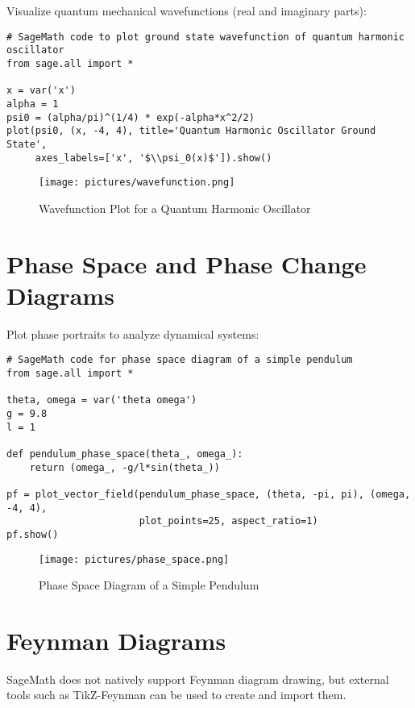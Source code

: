 \documentclass[12pt]{book}
\begin{document}
Visualize quantum mechanical wavefunctions (real and imaginary parts):

\begin{verbatim}
# SageMath code to plot ground state wavefunction of quantum harmonic oscillator
from sage.all import *

x = var('x')
alpha = 1
psi0 = (alpha/pi)^(1/4) * exp(-alpha*x^2/2)
plot(psi0, (x, -4, 4), title='Quantum Harmonic Oscillator Ground State',
     axes_labels=['x', '$\\psi_0(x)$']).show()
\end{verbatim}

\begin{figure}[H]
  \centering
  \texttt{[image: pictures/wavefunction.png]}
  \caption{Wavefunction Plot for a Quantum Harmonic Oscillator}
  \label{fig:wavefunction}
\end{figure}

\section{Phase Space and Phase Change Diagrams}

Plot phase portraits to analyze dynamical systems:

\begin{verbatim}
# SageMath code for phase space diagram of a simple pendulum
from sage.all import *

theta, omega = var('theta omega')
g = 9.8
l = 1

def pendulum_phase_space(theta_, omega_):
    return (omega_, -g/l*sin(theta_))

pf = plot_vector_field(pendulum_phase_space, (theta, -pi, pi), (omega, -4, 4),
                       plot_points=25, aspect_ratio=1)
pf.show()
\end{verbatim}

\begin{figure}[H]
  \centering
  \texttt{[image: pictures/phase\_space.png]}
  \caption{Phase Space Diagram of a Simple Pendulum}
  \label{fig:phase_space}
\end{figure}

\section{Feynman Diagrams}

SageMath does not natively support Feynman diagram drawing, but external tools such as TikZ-Feynman can be used to create and import them.
\end{document}
